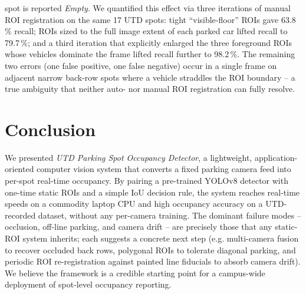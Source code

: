 \documentclass[10pt,twocolumn,letterpaper]{article}
\begin{document}
\begin{itemize}
          spot is reported \emph{Empty}. We quantified this effect via
          three iterations of manual ROI registration on the same 17
          UTD spots: tight ``visible-floor'' ROIs gave 63.8\,\% recall;
          ROIs sized to the full image extent of each parked car lifted
          recall to 79.7\,\%; and a third iteration that explicitly
          enlarged the three foreground ROIs whose vehicles dominate
          the frame lifted recall further to 98.2\,\%. The remaining
          two errors (one false positive, one false negative) occur in
          a single frame on adjacent narrow back-row spots where a
          vehicle straddles the ROI boundary -- a true ambiguity that
          neither auto- nor manual ROI registration can fully resolve.
\end{itemize}

\section{Conclusion}
\label{sec:conclusion}

We presented \emph{UTD Parking Spot Occupancy Detector}, a lightweight,
application-oriented computer vision system that converts a fixed parking
camera feed into per-spot real-time occupancy. By pairing a pre-trained
YOLOv8 detector with one-time static ROIs and a simple IoU decision rule,
the system reaches real-time speeds on a commodity laptop CPU and high
occupancy accuracy on a UTD-recorded dataset, without any per-camera
training. The dominant failure modes -- occlusion, off-line parking, and
camera drift -- are precisely those that any static-ROI system inherits;
each suggests a concrete next step (e.g. multi-camera fusion to recover
occluded back rows, polygonal ROIs to tolerate diagonal parking, and
periodic ROI re-registration against painted line fiducials to absorb
camera drift). We believe the framework is a credible starting point for a
campus-wide deployment of spot-level occupancy reporting.

{\small


}
\end{document}

